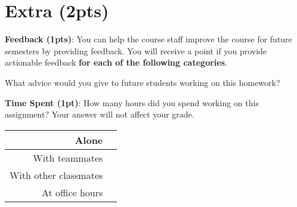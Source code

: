 \documentclass[12pt]{article}
\begin{document}
\clearpage
\section*{Extra (2pts)}

\textbf{Feedback (1pts)}: You can help the course staff improve the course for future semesters by providing feedback. You will receive a point if you provide actionable feedback \textbf{for each of the following categories}.

What advice would you give to future students working on this homework?
\begin{solution}[height=4cm]
\end{solution}

\noindent\textbf{Time Spent (1pt)}: How many hours did you spend working on this assignment? Your answer will not affect your grade.
\begin{table}[H]
    \centering
    \begin{tabular}{r|c}
        Alone &  \hspace{3em} %
        \\ \hline
        With teammates & \hspace{3em} %
        \\ \hline
        With other classmates & \hspace{3em} %
        \\ \hline
        At office hours & \hspace{3em} %
        \\ \hline
    \end{tabular}
\end{table}
\end{document}
